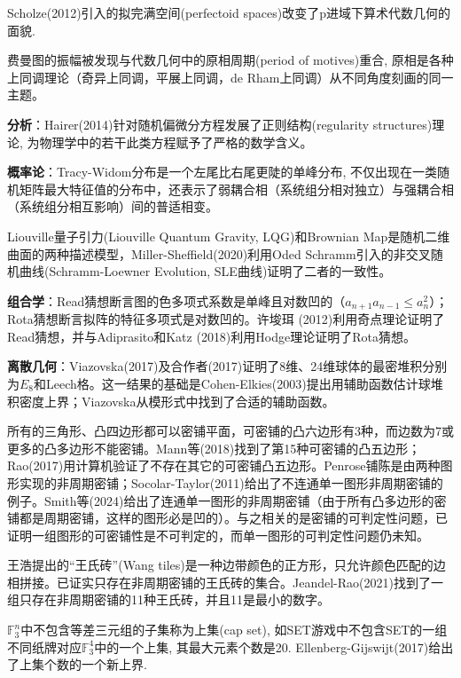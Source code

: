 \par Scholze(2012)引入的拟完满空间(perfectoid spaces)改变了p进域下算术代数几何的面貌. 

\par 费曼图的振幅被发现与代数几何中的原相周期(period of motives)重合, 原相是各种上同调理论（奇异上同调，平展上同调，de Rham上同调）从不同角度刻画的同一主题。

\par \textbf{分析}：Hairer(2014)针对随机偏微分方程发展了正则结构(regularity structures)理论, 为物理学中的若干此类方程赋予了严格的数学含义。 

\par \textbf{概率论}：Tracy-Widom分布是一个左尾比右尾更陡的单峰分布, 不仅出现在一类随机矩阵最大特征值的分布中，还表示了弱耦合相（系统组分相对独立）与强耦合相（系统组分相互影响）间的普适相变。

\par Liouville量子引力(Liouville Quantum Gravity, LQG)和Brownian Map是随机二维曲面的两种描述模型，Miller-Sheffield(2020)利用Oded Schramm引入的非交叉随机曲线(Schramm-Loewner Evolution, SLE曲线)证明了二者的一致性。

\par \textbf{组合学}：Read猜想断言图的色多项式系数是单峰且对数凹的（$a_{n+1}a_{n-1}\le a_n^2$）；Rota猜想断言拟阵的特征多项式是对数凹的。许{埈}珥 (2012)利用奇点理论证明了Read猜想，并与Adiprasito和Katz (2018)利用Hodge理论证明了Rota猜想。 

\par \textbf{离散几何}：Viazovska(2017)及合作者(2017)证明了8维、24维球体的最密堆积分别为$E_8$和Leech格。这一结果的基础是Cohen-Elkies(2003)提出用辅助函数估计球堆积密度上界；Viazovska从模形式中找到了合适的辅助函数。

\par 所有的三角形、凸四边形都可以密铺平面，可密铺的凸六边形有3种，而边数为7或更多的凸多边形不能密铺。Mann等(2018)找到了第15种可密铺的凸五边形；Rao(2017)用计算机验证了不存在其它的可密铺凸五边形。Penrose铺陈是由两种图形实现的非周期密铺；Socolar-Taylor(2011)给出了不连通单一图形非周期密铺的例子。Smith等(2024)给出了连通单一图形的非周期密铺（由于所有凸多边形的密铺都是周期密铺，这样的图形必是凹的）。与之相关的是密铺的可判定性问题，已证明一组图形的可密铺性是不可判定的，而单一图形的可判定性问题仍未知。

\par 王浩提出的“王氏砖”(Wang tiles)是一种边带颜色的正方形，只允许颜色匹配的边相拼接。已证实只存在非周期密铺的王氏砖的集合。Jeandel-Rao(2021)找到了一组只存在非周期密铺的11种王氏砖，并且11是最小的数字。

\par $\mathbb{F}_3^n$中不包含等差三元组的子集称为上集(cap set), 如SET游戏中不包含SET的一组不同纸牌对应$\mathbb{F}_3^4$中的一个上集, 其最大元素个数是20. Ellenberg-Gijswijt(2017)给出了上集个数的一个新上界. 